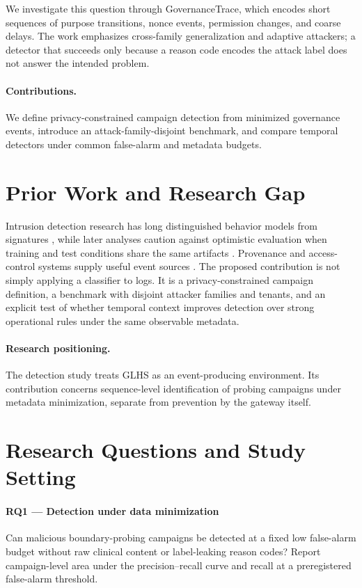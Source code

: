 \documentclass[11pt,a4paper]{article}
\begin{document}
We investigate this question through GovernanceTrace, which encodes short sequences of purpose transitions, nonce events, permission changes, and coarse delays. The work emphasizes cross-family generalization and adaptive attackers; a detector that succeeds only because a reason code encodes the attack label does not answer the intended problem.

\paragraph{Contributions.} We define privacy-constrained campaign detection from minimized governance events, introduce an attack-family-disjoint benchmark, and compare temporal detectors under common false-alarm and metadata budgets.

\section{Prior Work and Research Gap}
Intrusion detection research has long distinguished behavior models from signatures \cite{denning1987}, while later analyses caution against optimistic evaluation when training and test conditions share the same artifacts \cite{sommer2010}. Provenance and access-control systems supply useful event sources \cite{sandhu1996,hu2014}. The proposed contribution is not simply applying a classifier to logs. It is a privacy-constrained campaign definition, a benchmark with disjoint attacker families and tenants, and an explicit test of whether temporal context improves detection over strong operational rules under the same observable metadata.

\paragraph{Research positioning.} The detection study treats GLHS as an event-producing environment. Its contribution concerns sequence-level identification of probing campaigns under metadata minimization, separate from prevention by the gateway itself.

\section{Research Questions and Study Setting}
\paragraph{RQ1 — Detection under data minimization} Can malicious boundary-probing campaigns be detected at a fixed low false-alarm budget without raw clinical content or label-leaking reason codes? Report campaign-level area under the precision–recall curve and recall at a preregistered false-alarm threshold.
\end{document}

